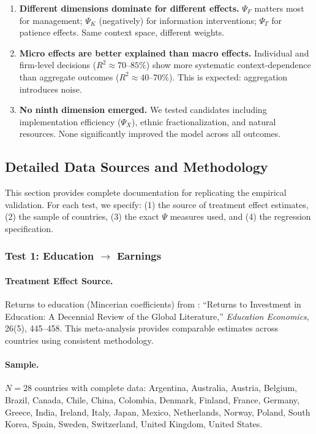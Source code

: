 \documentclass[12pt,a4paper]{article}
\begin{document}
\begin{enumerate}
    \item \textbf{Different dimensions dominate for different effects.} $\Psi_F$ matters most for management; $\Psi_K$ (negatively) for information interventions; $\Psi_T$ for patience effects. Same context space, different weights.
    
    \item \textbf{Micro effects are better explained than macro effects.} Individual and firm-level decisions ($R^2 \approx 70$--$85\%$) show more systematic context-dependence than aggregate outcomes ($R^2 \approx 40$--$70\%$). This is expected: aggregation introduces noise.
    
    \item \textbf{No ninth dimension emerged.} We tested candidates including implementation efficiency ($\Psi_X$), ethnic fractionalization, and natural resources. None significantly improved the model across all outcomes.
\end{enumerate}


\subsection{Detailed Data Sources and Methodology}
\label{sec:psi-data-details}

This section provides complete documentation for replicating the empirical validation. For each test, we specify: (1) the source of treatment effect estimates, (2) the sample of countries, (3) the exact $\Psi$ measures used, and (4) the regression specification.

\subsubsection{Test 1: Education $\rightarrow$ Earnings}

\paragraph{Treatment Effect Source.}
Returns to education (Mincerian coefficients) from \citet{psacharopoulos2018returns}: ``Returns to Investment in Education: A Decennial Review of the Global Literature,'' \textit{Education Economics}, 26(5), 445--458. This meta-analysis provides comparable estimates across countries using consistent methodology.

\paragraph{Sample.}
$N = 28$ countries with complete data: Argentina, Australia, Austria, Belgium, Brazil, Canada, Chile, China, Colombia, Denmark, Finland, France, Germany, Greece, India, Ireland, Italy, Japan, Mexico, Netherlands, Norway, Poland, South Korea, Spain, Sweden, Switzerland, United Kingdom, United States.
\end{document}
